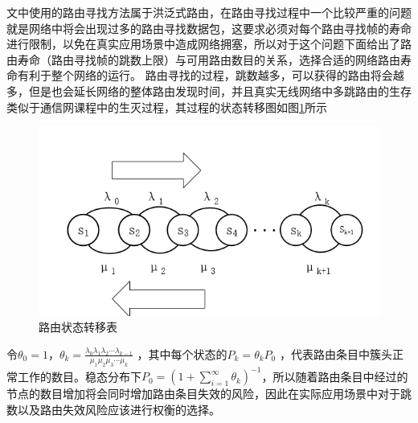 \documentclass[a4paper,AutoFakeBold,oneside,12pt]{book}
\begin{document}
  文中使用的路由寻找方法属于洪泛式路由，在路由寻找过程中一个比较严重的问题就是网络中将会出现过多的路由寻找数据包，这要求必须对每个路由寻找帧的寿命进行限制，以免在真实应用场景中造成网络拥塞，所以对于这个问题下面给出了路由寿命（路由寻找帧的跳数上限）与可用路由数目的关系，选择合适的网络路由寿命有利于整个网络的运行。
  路由寻找的过程，跳数越多，可以获得的路由将会越多，但是也会延长网络的整体路由发现时间，并且真实无线网络中多跳路由的生存类似于通信网课程中的生灭过程\cite{tongxinwang}，其过程的状态转移图如图\ref{shengmie}所示
\begin{figure}[H]
 \centering 
\includegraphics[scale=0.5]{pictures/shengmie.png} 
 \caption{路由状态转移表 
 }\label{shengmie}
\end{figure}


 
  令$\theta_0=1$，$\theta_k=\frac{\lambda_0\lambda_1\lambda_2\cdots\lambda_{k-1}}{\mu_1\mu_2\mu_3\cdots\mu_k}$ ，其中每个状态的$P_k=\theta_k P_0$  ，代表路由条目中簇头正常工作的数目。稳态分布下$P_0=\left(1+\displaystyle\sum_{i=1}^{\infty}\theta_k\right)^{-1}$，所以随着路由条目中经过的节点的数目增加将会同时增加路由条目失效的风险，因此在实际应用场景中对于跳数以及路由失效风险应该进行权衡的选择。
  
\end{document}
